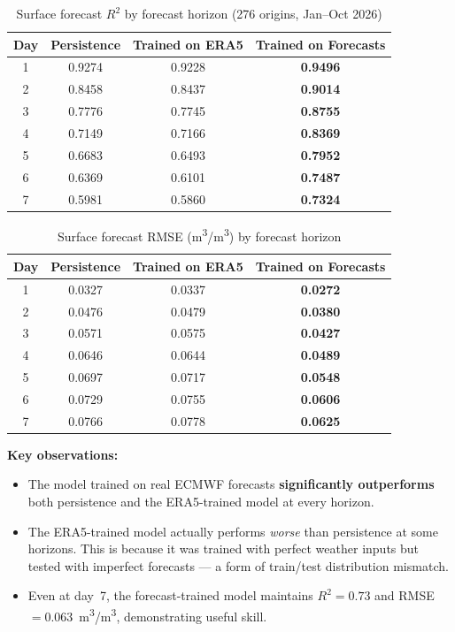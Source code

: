 \documentclass[12pt, a4paper]{article}
\begin{document}
\begin{table}[H]
\centering
\caption{Surface forecast $R^2$ by forecast horizon (276 origins, Jan--Oct 2026)}
\label{tab:forecast_r2}
\begin{tabular}{cccc}
\toprule
\textbf{Day} & \textbf{Persistence} & \textbf{Trained on ERA5} & \textbf{Trained on Forecasts} \\
\midrule
1 & 0.9274 & 0.9228 & \textbf{0.9496} \\
2 & 0.8458 & 0.8437 & \textbf{0.9014} \\
3 & 0.7776 & 0.7745 & \textbf{0.8755} \\
4 & 0.7149 & 0.7166 & \textbf{0.8369} \\
5 & 0.6683 & 0.6493 & \textbf{0.7952} \\
6 & 0.6369 & 0.6101 & \textbf{0.7487} \\
7 & 0.5981 & 0.5860 & \textbf{0.7324} \\
\bottomrule
\end{tabular}
\end{table}

\begin{table}[H]
\centering
\caption{Surface forecast RMSE (m\textsuperscript{3}/m\textsuperscript{3}) by forecast horizon}
\label{tab:forecast_rmse}
\begin{tabular}{cccc}
\toprule
\textbf{Day} & \textbf{Persistence} & \textbf{Trained on ERA5} & \textbf{Trained on Forecasts} \\
\midrule
1 & 0.0327 & 0.0337 & \textbf{0.0272} \\
2 & 0.0476 & 0.0479 & \textbf{0.0380} \\
3 & 0.0571 & 0.0575 & \textbf{0.0427} \\
4 & 0.0646 & 0.0644 & \textbf{0.0489} \\
5 & 0.0697 & 0.0717 & \textbf{0.0548} \\
6 & 0.0729 & 0.0755 & \textbf{0.0606} \\
7 & 0.0766 & 0.0778 & \textbf{0.0625} \\
\bottomrule
\end{tabular}
\end{table}

\textbf{Key observations:}
\begin{itemize}
    \item The model trained on real ECMWF forecasts \textbf{significantly outperforms} both persistence and the ERA5-trained model at every horizon.
    \item The ERA5-trained model actually performs \textit{worse} than persistence at some horizons. This is because it was trained with perfect weather inputs but tested with imperfect forecasts --- a form of train/test distribution mismatch.
    \item Even at day~7, the forecast-trained model maintains $R^2 = 0.73$ and RMSE $= 0.063$~m\textsuperscript{3}/m\textsuperscript{3}, demonstrating useful skill.
\end{itemize}
\end{document}
